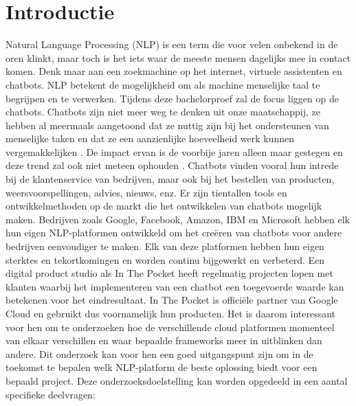 
\section{Introductie} %
\label{sec:introductie}
Natural Language Processing (NLP) is een term die voor velen onbekend in de oren klinkt, maar toch is het iets waar de meeste mensen dagelijks mee in contact komen. Denk maar aan een zoekmachine op het internet, virtuele assistenten en chatbots. NLP betekent de mogelijkheid om als machine menselijke taal te begrijpen en te verwerken. Tijdens deze bachelorproef zal de focus liggen op de chatbots. Chatbots zijn niet meer weg te denken uit onze maatschappij, ze hebben al meermaals aangetoond dat ze nuttig zijn bij het ondersteunen van menselijke taken en dat ze een aanzienlijke hoeveelheid werk kunnen vergemakkelijken \autocite{Atwell2007}.  De impact ervan is de voorbije jaren alleen maar gestegen en deze trend zal ook niet meteen ophouden \autocite{BRAIN2019}. Chatbots vinden vooral hun intrede bij de klantenservice van bedrijven, maar ook bij het bestellen van producten, weersvoorspellingen, advies, nieuws, enz. Er zijn tientallen tools en ontwikkelmethoden op de markt die het ontwikkelen van chatbots mogelijk maken. Bedrijven zoals Google, Facebook, Amazon, IBM en Microsoft hebben elk hun eigen NLP-platformen ontwikkeld om het creëren van chatbots voor andere bedrijven eenvoudiger te maken. Elk van deze platformen hebben hun eigen sterktes en tekortkomingen en worden continu bijgewerkt en verbeterd. Een digital product studio als In The Pocket heeft regelmatig projecten lopen met klanten waarbij het implementeren van een chatbot een toegevoerde waarde kan betekenen voor het eindresultaat. In The Pocket is officiële partner van Google Cloud en gebruikt dus voornamelijk hun producten. Het is daarom interessant voor hen om te onderzoeken hoe de verschillende cloud platformen momenteel van elkaar verschillen en waar bepaalde frameworks meer in uitblinken dan andere. Dit onderzoek kan voor hen een goed uitgangspunt zijn om in de toekomst te bepalen welk NLP-platform de beste oplossing biedt voor een bepaald project. Deze onderzoeksdoelstelling kan worden opgedeeld in een aantal specifieke deelvragen:

